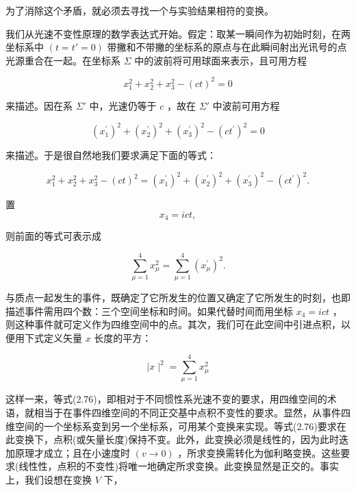 为了消除这个矛盾，就必须去寻找一个与实验结果相符的变换。

我们从光速不变性原理的数学表达式开始。假定：取某一瞬间作为初始时刻，在两坐标系中 $(t=t'=0)$ 带撇和不带撇的坐标系的原点与在此瞬间射出光讯号的点光源重合在一起。在坐标系 $\Sigma$ 中的波前将可用球面来表示，且可用方程

\begin{equation*}
x _ {1} ^ {2} + x _ {2} ^ {2} + x _ {3} ^ {2} - (c t) ^ {2} = 0
\end{equation*}

来描述。因在系 $\Sigma'$ 中，光速仍等于 $c$ ，故在 $\Sigma'$ 中波前可用方程

\begin{equation*}
\left(x _ {1} ^ {\prime}\right) ^ {2} + \left(x _ {2} ^ {\prime}\right) ^ {2} + \left(x _ {3} ^ {\prime}\right) ^ {2} - \left(c t ^ {\prime}\right) ^ {2} = 0
\end{equation*}

来描述。于是很自然地我们要求满足下面的等式：

\begin{equation*}
x _ {1} ^ {2} + x _ {2} ^ {2} + x _ {3} ^ {2} - (c t) ^ {2} = \left(x _ {1} ^ {\prime}\right) ^ {2} + \left(x _ {2} ^ {\prime}\right) ^ {2} + \left(x _ {3} ^ {\prime}\right) ^ {2} - \left(c t ^ {\prime}\right) ^ {2}.
\end{equation*}

置
\begin{equation*}
x _ {4} = i c t,
\end{equation*}

则前面的等式可表示成

\begin{equation*}
\sum_ {\mu = 1} ^ {4} x _ {\mu} ^ {2} = \sum_ {\mu = 1} ^ {4} \left(x _ {\mu} ^ {\prime}\right) ^ {2}.\tag{2.76}
\end{equation*}

与质点一起发生的事件，既确定了它所发生的位置又确定了它所发生的时刻，也即描述事件需用四个数：三个空间坐标和时间。如果代替时间而用坐标 $x_{4} = ict$ ，则这种事件就可定义作为四维空间中的点。其次，我们可在此空间中引进点积，以便用下式定义矢量 $x$ 长度的平方：

\begin{equation*}
\mid x \mid^ {2} = \sum_ {\mu = 1} ^ {4} x _ {\mu} ^ {2}
\end{equation*}

这样一来，等式(2.76)，即相对于不同惯性系光速不变的要求，用四维空间的术语，就相当于在事件四维空间的不同正交基中点积不变性的要求。显然，从事件四维空间的一个坐标系变到另一个坐标系，可用某个变换来实现。等式(2.76)要求在此变换下，点积(或矢量长度)保持不变。此外，此变换必须是线性的，因为此时迭加原理才成立；且在小速度时 $(v\to 0)$ ，所求变换需转化为伽利略变换。这些要求(线性性，点积的不变性)将唯一地确定所求变换。此变换显然是正交的。事实上，我们设想在变换 $V$ 下，

